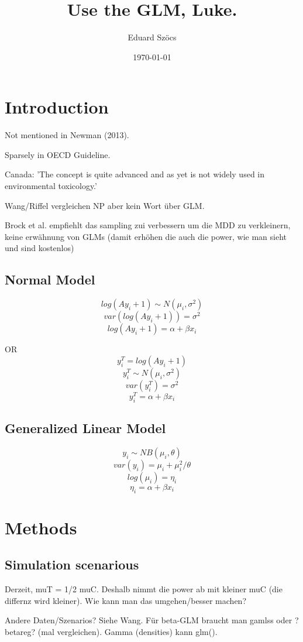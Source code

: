 \documentclass{scrartcl}\usepackage[]{graphicx}\usepackage[]{color}
\title{Use the GLM, Luke.}
\subtitle{}
\author{Eduard Szöcs}
\date{\today}
\begin{document}
\maketitle

\section{Introduction}
Not mentioned in Newman (2013). 

Sparsely in OECD Guideline. 

Canada: 'The concept is quite advanced and as yet is not widely used in environmental toxicology.'

Wang/Riffel vergleichen NP aber kein Wort über GLM.

Brock et al. empfiehlt das sampling zui verbessern um die MDD zu verkleinern, keine erwähnung von GLMs (damit erhöhen die auch die power, wie man sieht und sind kostenlos)

\subsection{Normal Model}
$$ log(Ay_i + 1) \sim N(\mu_i, \sigma^2) $$
$$ var(log(Ay_i + 1)) = \sigma^2 $$
$$ log(Ay_i + 1) = \alpha + \beta x_i $$

OR
$$ y_i^T = log(Ay_i + 1) $$
$$ y_i^T  \sim N(\mu_i, \sigma^2) $$
$$ var(y_i^T ) = \sigma^2 $$
$$ y_i^T  = \alpha + \beta x_i $$

\subsection{Generalized Linear Model}
$$ y_i \sim NB(\mu_i, \theta) $$
$$ var(y_i) = \mu_i + \mu_i^2 / \theta $$ 
$$ log(\mu_i) = \eta_i $$
$$ \eta_i = \alpha + \beta x_i $$


\section{Methods}
\subsection{Simulation scenarious}

Derzeit, muT = 1/2 muC. Deshalb nimmt die power ab mit kleiner muC (die differnz wird kleiner). Wie kann man das umgehen/besser machen?

Andere Daten/Szenarios? Siehe Wang. 
Für beta-GLM braucht man gamlss oder ?betareg? (mal vergleichen). Gamma (densities) kann glm().
\end{document}
